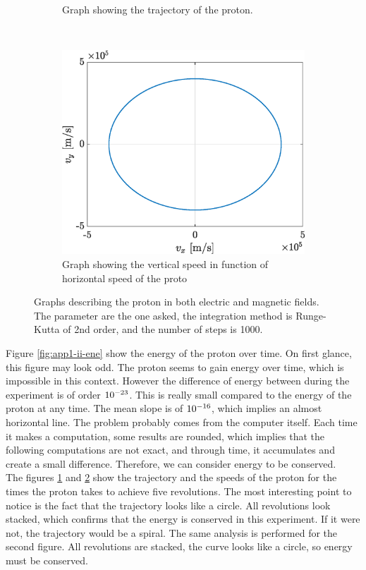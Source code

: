 \documentclass[a4paper,12pt,twoside]{article}
\begin{document}
\begin{figure}[h]
\begin{subfigure}[t]{0.32\textwidth}
	\caption{Graph showing the trajectory of the proton.}
	\label{fig:app1-ii-traj}
\end{subfigure}
~
\begin{subfigure}[t]{0.32\textwidth}
	\includegraphics[width=\textwidth]{graphs/app1_ii_vit.eps}
	\caption{Graph showing the vertical speed in function of horizontal speed of the proto}
	\label{fig:app1-ii-vit}
\end{subfigure}
\caption{Graphs describing the proton in both electric and magnetic fields. The parameter are the one asked, the integration method is Runge-Kutta of 2nd order, and the number of steps is \SI{1000}{}.}
\label{fig:app1_ii}
\end{figure}

Figure \ref{fig:app1-ii-ene} show the energy of the proton over time.
On first glance, this figure may look odd.
The proton seems to gain energy over time, which is impossible in this context.
However the difference of energy between during the experiment is of order $\SI{d-23}{}$.
This is really small compared to the energy of the proton at any time.
The mean slope is of $\SI{d-16}{}$, which implies an almost horizontal line.
The problem probably comes from the computer itself.
Each time it makes a computation, some results are rounded, which implies that the following computations are not exact, and through time, it accumulates and create a small difference.
Therefore, we can consider energy to be conserved.\\

The figures \ref{fig:app1-ii-traj} and \ref{fig:app1-ii-vit} show the trajectory and the speeds of the proton for the times the proton takes to achieve five revolutions.
The most interesting point to notice is the fact that the trajectory looks like a circle.
All revolutions look stacked, which confirms that the energy is conserved in this experiment.
If it were not, the trajectory would be a spiral.
The same analysis is performed for the second figure.
All revolutions are stacked, the curve looks like a circle, so energy must be conserved.\\
\end{document}

